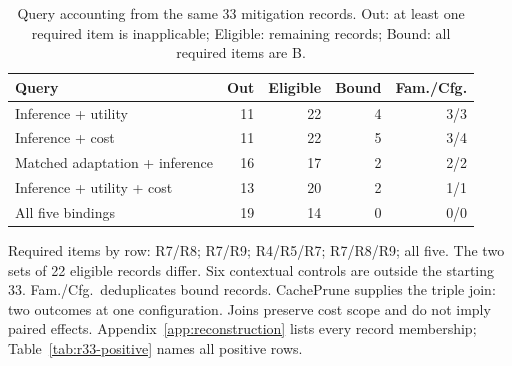 \begin{table}[t]\centering\footnotesize
\caption{Query accounting from the same 33 mitigation records. Out: at least one required item is inapplicable; Eligible: remaining records; Bound: all required items are B.}\label{tab:r19-joint}
\begin{tabularx}{\columnwidth}{@{}Yrrrr@{}}\toprule
Query & Out & Eligible & Bound & Fam./Cfg.\\\midrule
Inference + utility & 11 & 22 & 4 & 3/3\\
Inference + cost & 11 & 22 & 5 & 3/4\\
Matched adaptation + inference & 16 & 17 & 2 & 2/2\\
Inference + utility + cost & 13 & 20 & 2 & 1/1\\
All five bindings & 19 & 14 & 0 & 0/0\\
\bottomrule\end{tabularx}
\par\smallskip\raggedright Required items by row: R7/R8; R7/R9; R4/R5/R7; R7/R8/R9; all five. The two sets of 22 eligible records differ. Six contextual controls are outside the starting 33. Fam./Cfg.\ deduplicates bound records. CachePrune supplies the triple join: two outcomes at one configuration. Joins preserve cost scope and do not imply paired effects. Appendix~\ref{app:reconstruction} lists every record membership; Table~\ref{tab:r33-positive} names all positive rows.
\end{table}
